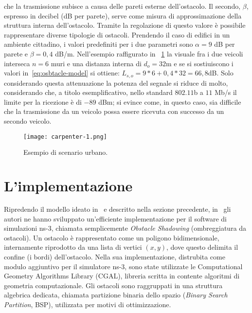 che la trasmissione subisce a causa delle pareti esterne dell'ostacolo.
Il secondo, $\beta$, espresso in decibel (dB per parete), serve come misura di approssimazione della struttura interna dell'ostacolo.
Tramite la regolazione di questo valore è possibile rappresentare diverse tipologie di ostacoli.
Prendendo il caso di edifici in un ambiente cittadino, i valori predefiniti per i due parametri sono $\alpha = 9$ dB per parete e $\beta = 0,4$ dB/m.
Nell'esempio raffigurato in \figurename~\ref{fig:scenario-urbano-1} la visuale fra i due veicoli interseca $n=6$ muri e una distanza interna di $d_o=32$m
e se si sostiuiscono i valori in~\ref{eq:osbtacle-model} si ottiene: $L_{s,o} = 9*6 + 0,4*32 = 66,8$dB.
Solo considerando questa attenuazione la potenza del segnale si riduce di molto, considerando che,
a titolo esemplificativo, nello standard $802.11$b a $11$ Mb/s il limite per la ricezione è di $-89$ dBm;
si evince come, in questo caso, sia difficile che la trasmissione da un veicolo
possa essere ricevuta con successo da un secondo veicolo.
%
\begin{figure}[htbp]
	\centering
		\texttt{[image: carpenter-1.png]}
\caption{Esempio di scenario urbano.\label{fig:scenario-urbano-1}}
\end{figure}
%
%
\section{L'implementazione}\label{sec:implementazione}
Ripredendo il modello ideato in~\cite{5720204} e descritto nella sezione precedente, in~\cite{Carpenter:2015:OMI:2756509.2756512} gli autori ne hanno sviluppato
un'efficiente implementazione per il software di simulazioni ns-3, chiamata semplicemente \textit{Obstacle Shadowing} (ombreggiatura da ostacoli).
Un ostacolo è rappresentato come un poligono bidimensionale, internamente riprodotto da una lista di vertici $(x,y)$, dove questo delimita
il confine (i bordi) dell'ostacolo.
Nella sua implementazione, distrubita come modulo aggiuntivo per il simulatore ns-3,
sono state utilizzate le Computational Geometry Algorithms Library (CGAL), libreria scritta in \Cpp contente algoritmi di geometria computazionale.
Gli ostacoli sono raggruppati in una struttura algebrica dedicata, chiamata partizione binaria dello spazio (\textit{Binary Search Partition}, BSP), utilizzata
per motivi di ottimizzazione.

